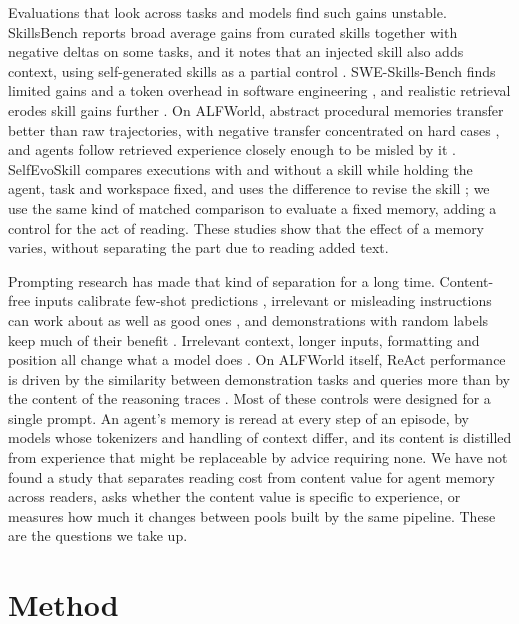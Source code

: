 Evaluations that look across tasks and models find such gains unstable. SkillsBench reports broad
average gains from curated skills together with negative deltas on some tasks, and it notes that an
injected skill also adds context, using self-generated skills as a partial control
\citep{li2026skillsbench}. SWE-Skills-Bench finds limited gains and a token overhead in software
engineering \citep{han2026sweskills}, and realistic retrieval erodes skill gains further
\citep{liu2026wildskills}. On ALFWorld, abstract procedural memories transfer better than raw
trajectories, with negative transfer concentrated on hard cases \citep{hu2026memory}, and agents follow
retrieved experience closely enough to be misled by it \citep{xiong2026memory}. SelfEvoSkill compares
executions with and without a skill while holding the agent, task and workspace fixed, and uses the
difference to revise the skill \citep{gao2026selfevoskill}; we use the same kind of matched comparison
to evaluate a fixed memory, adding a control for the act of reading. These studies show that the effect
of a memory varies, without separating the part due to reading added text.

Prompting research has made that kind of separation for a long time. Content-free inputs calibrate
few-shot predictions \citep{zhao2021calibrate}, irrelevant or misleading instructions can work about as
well as good ones \citep{webson2022prompt}, and demonstrations with random labels keep much of their
benefit \citep{min2022rethinking}. Irrelevant context, longer inputs, formatting and position all change
what a model does \citep{shi2023distracted,levy2024sametask,sclar2023quantifying,liu2024lost}. On
ALFWorld itself, ReAct performance is driven by the similarity between demonstration tasks and queries
more than by the content of the reasoning traces \citep{verma2024brittle}. Most of these controls were
designed for a single prompt. An agent's memory is reread at every step of an episode, by
models whose tokenizers and handling of context differ, and its content is distilled from experience
that might be replaceable by advice requiring none. We have not found a study that separates reading
cost from content value for agent memory across readers, asks whether the content value is specific to
experience, or measures how much it changes between pools built by the same pipeline. These are the
questions we take up.

\section{Method}
\label{sec:method}

